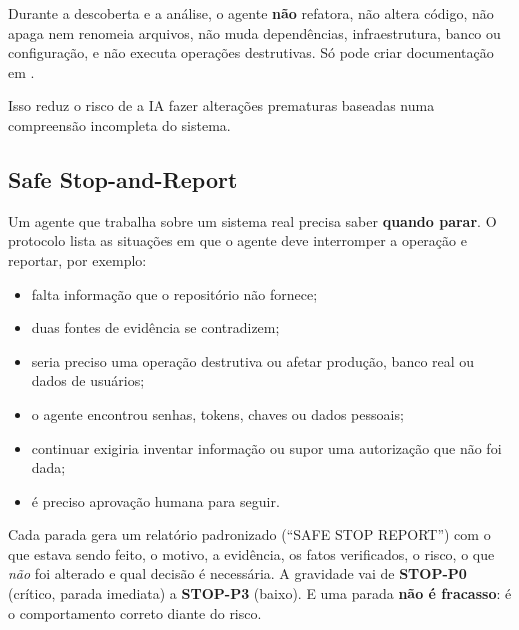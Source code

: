 Durante a descoberta e a análise, o agente \textbf{não} refatora, não altera código, não apaga nem renomeia arquivos, não muda dependências, infraestrutura, banco ou configuração, e não executa operações destrutivas. Só pode criar documentação em .

\begin{conceito}
Isso reduz o risco de a IA fazer alterações prematuras baseadas numa compreensão incompleta do sistema.
\end{conceito}

\subsection{Safe Stop-and-Report}

Um agente que trabalha sobre um sistema real precisa saber \textbf{quando parar}. O protocolo lista as situações em que o agente deve interromper a operação e reportar, por exemplo:

\begin{itemize}
  \item falta informação que o repositório não fornece;
  \item duas fontes de evidência se contradizem;
  \item seria preciso uma operação destrutiva ou afetar produção, banco real ou dados de usuários;
  \item o agente encontrou senhas, tokens, chaves ou dados pessoais;
  \item continuar exigiria inventar informação ou supor uma autorização que não foi dada;
  \item é preciso aprovação humana para seguir.
\end{itemize}

\begin{center}
\end{center}

Cada parada gera um relatório padronizado (\enquote{SAFE STOP REPORT}) com o que estava sendo feito, o motivo, a evidência, os fatos verificados, o risco, o que \emph{não} foi alterado e qual decisão é necessária. A gravidade vai de \textbf{STOP-P0} (crítico, parada imediata) a \textbf{STOP-P3} (baixo). E uma parada \textbf{não é fracasso}: é o comportamento correto diante do risco.

